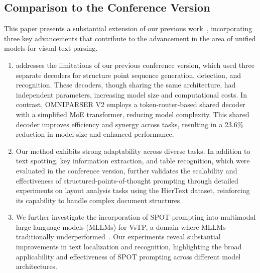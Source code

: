 \subsection{Comparison to the Conference Version}
This paper presents a substantial extension of our previous work~\cite{omniparser}, incorporating three key advancements that contribute to the advancement in the area of unified models for visual text parsing.

\begin{enumerate}

\item \ourmodel addresses the limitations of our previous conference version, which used three separate decoders for structure point sequence generation, detection, and recognition. These decoders, though sharing the same architecture, had independent parameters, increasing model size and computational costs. In contrast, OMNIPARSER V2 employs a token-router-based shared decoder with a simplified MoE transformer, reducing model complexity. This shared decoder improves efficiency and synergy across tasks, resulting in a 23.6\% reduction in model size and enhanced performance.

\item Our method exhibits strong adaptability across diverse tasks. In addition to text spotting, key information extraction, and table recognition, which were evaluated in the conference version, \ourmodel further validates the scalability and effectiveness of structured-points-of-thought prompting through detailed experiments on layout analysis tasks using the HierText dataset, reinforcing its capability to handle complex document structures.

\item We further investigate the incorporation of SPOT prompting into multimodal large language models (MLLMs) for VsTP, a domain where MLLMs traditionally underperformed~\cite{Liu2023OCRBenchOT,Yang2024CCOCRAC,fu2024ocrbenchv2}. Our experiments reveal substantial improvements in text localization and recognition, highlighting the broad applicability and effectiveness of SPOT prompting across different model architectures.

\end{enumerate}